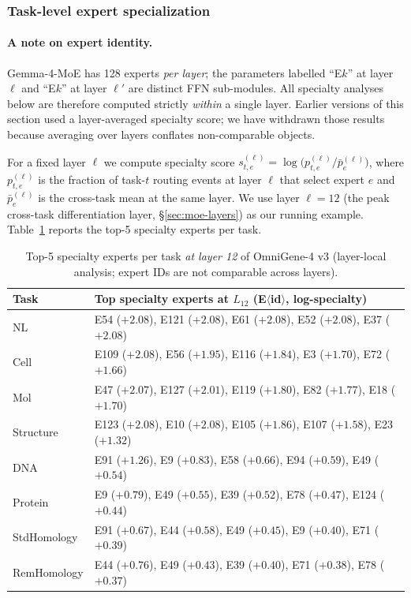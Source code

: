 \documentclass[11pt]{article}
\begin{document}
\subsubsection{Task-level expert specialization}
\label{sec:moe-specialty}

\paragraph{A note on expert identity.} Gemma-4-MoE has 128 experts \emph{per layer}; the parameters labelled ``E$k$'' at layer $\ell$ and ``E$k$'' at layer $\ell'$ are distinct FFN sub-modules. All specialty analyses below are therefore computed strictly \emph{within} a single layer. Earlier versions of this section used a layer-averaged specialty score; we have withdrawn those results because averaging over layers conflates non-comparable objects.

For a fixed layer $\ell$ we compute specialty score $s_{t,e}^{(\ell)} = \log\!\big(p_{t,e}^{(\ell)} / \bar p_e^{(\ell)}\big)$, where $p_{t,e}^{(\ell)}$ is the fraction of task-$t$ routing events at layer $\ell$ that select expert $e$ and $\bar p_e^{(\ell)}$ is the cross-task mean at the same layer. We use layer $\ell = 12$ (the peak cross-task differentiation layer, \S\ref{sec:moe-layers}) as our running example. Table~\ref{tab:specialty-L12} reports the top-5 specialty experts per task.

\begin{table}[H]
\centering
\footnotesize
\caption{Top-5 specialty experts per task \emph{at layer 12} of OmniGene-4 v3 (layer-local analysis; expert IDs are not comparable across layers).}
\label{tab:specialty-L12}
\begin{tabular}{ll}
\toprule
\textbf{Task} & \textbf{Top specialty experts at $L_{12}$ (E$\langle$id$\rangle$, log-specialty)} \\
\midrule
NL            & E54 ($+2.08$), E121 ($+2.08$), E61 ($+2.08$), E52 ($+2.08$), E37 ($+2.08$) \\
Cell          & E109 ($+2.08$), E56 ($+1.95$), E116 ($+1.84$), E3 ($+1.70$), E72 ($+1.66$) \\
Mol           & E47 ($+2.07$), E127 ($+2.01$), E119 ($+1.80$), E82 ($+1.77$), E18 ($+1.70$) \\
Structure     & E123 ($+2.08$), E10 ($+2.08$), E105 ($+1.86$), E107 ($+1.58$), E23 ($+1.32$) \\
DNA           & E91 ($+1.26$), E9 ($+0.83$), E58 ($+0.66$), E94 ($+0.59$), E49 ($+0.54$) \\
Protein       & E9 ($+0.79$), E49 ($+0.55$), E39 ($+0.52$), E78 ($+0.47$), E124 ($+0.44$) \\
StdHomology   & E91 ($+0.67$), E44 ($+0.58$), E49 ($+0.45$), E9 ($+0.40$), E71 ($+0.39$) \\
RemHomology   & E44 ($+0.76$), E49 ($+0.43$), E39 ($+0.40$), E71 ($+0.38$), E78 ($+0.37$) \\
\bottomrule
\end{tabular}
\end{table}
\end{document}
